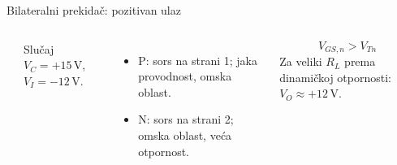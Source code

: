 \begin{frame}[label=09_3-s062]{Bilateralni prekidač: pozitivan ulaz}
\begin{columns}[c,onlytextwidth]
\begin{center}

\end{center}
Slučaj $V_C=+15\,\mathrm V$, $V_I=-12\,\mathrm V$.
\begin{itemize}
\item P: sors na strani 1; jaka provodnost, omska oblast.
\item N: sors na strani 2; omska oblast, veća otpornost.
\end{itemize}
\[V_{GS,n}>V_{Tn}\]
Za veliki $R_L$ prema dinamičkoj otpornosti: $V_O\approx+12\,\mathrm V$.
\end{columns}
\end{frame}

